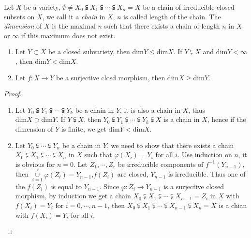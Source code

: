 \begin{definition}
	Let $ X $ be a variety, $ \emptyset\neq X_0\subsetneqq X_1\subsetneqq\cdots\subsetneqq X_n=X $ be a chain of irreducible closed subsets on $ X $, we call it a \textit{chain} in $ X $, $ n $ is called length of the chain. The \textit{dimension} of $ X $ is the maximal $ n $ such that there exists a chain of length $ n $ in $ X $ or $ \infty $ if this maximum does not exist.
\end{definition}
\begin{lemma}{}
  \noindent
	\begin{enumerate}
		\item Let $ Y\subset X $ be a closed subvariety, then $ \mathrm{dim}Y\leq \mathrm{dim}X $. If $ Y\subsetneqq X $ and $ \mathrm{dim}Y <\infty$, then $ \mathrm{dim} Y<\mathrm{dim}X $.
		\item Let $ f:X\to Y $ be a surjective closd morphism, then $ \mathrm{dim}X\geq \mathrm{dim}Y $.
	\end{enumerate}
\end{lemma}
\begin{proof}
	\begin{enumerate}
		\item Let $ Y_0\subsetneqq Y_1\subsetneqq\cdots\subsetneqq Y_k $ be a chain in $ Y $, it is also a chain in $ X $, thus $ \mathrm{dim}X\supset \mathrm{dim}Y $. If $ Y\subsetneqq X $, then $ Y_0\subsetneqq Y_1\subsetneqq \cdots\subsetneqq Y_k\subsetneqq X $ is a chain in $ X $, hence if the dimension of  $ Y $ is finite, we get $ \mathrm{dim}Y<\mathrm{dim}X $.
		\item Let $ Y_0\subsetneqq \cdots\subsetneqq Y_n $ be a chain in $ Y $, we need to show that there exists a chain $ X_0\subsetneqq X_1\subsetneqq \cdots\subsetneqq X_n $ in $ X $ such that $ \varphi(X_i)=Y_i $ for all $ i $. Use induction on $ n $, it is obvious for $ n=0 $. Let $ Z_1,\cdots,Z_r $ be irreducible components of $ f^{-1}(Y_{n-1}) $, then $ \mathop{\cup}\limits_{i=1}^{r}\varphi(Z_i)=Y_{n-1} $,$ f(Z_i) $ are closed, $ Y_{n-1} $ is irreducible. Thus one of the $ f(Z_i) $ is equal to $ Y_{n-1} $.  Since $ \varphi :Z_i\to Y_{n-1} $ is a surjective closed morphism, by induction we get a chain $ X_0\subsetneqq X_1\subsetneqq \cdots\subsetneqq X_{n-1}=Z_i $ in $ X $ with $ f(X_i)=Y_i $ for $ i=0,\cdots,n-1 $, then $ X_0\subsetneqq X_1\subsetneqq \cdots\subsetneqq X_{n-1}\subsetneqq X_n=X $ is a chian with $ f(X_i)=Y_i $ for all $ i $.
	\end{enumerate}
\end{proof}
